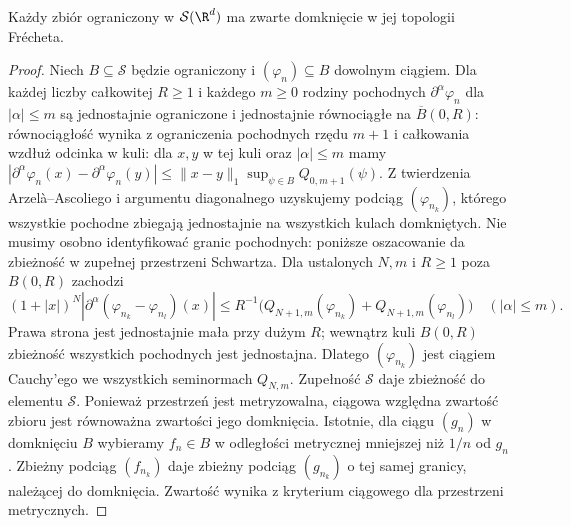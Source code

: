 \begin{lemat}
\label{lem:montel-schwartz22}
Każdy zbiór ograniczony w $\mathcal S(\R^d)$ ma zwarte
domknięcie w jej topologii Frécheta.
\end{lemat}
\begin{proof}
Niech $B\subseteq\mathcal S$ będzie ograniczony i
$(\varphi_n)\subseteq B$ dowolnym ciągiem.
Dla każdej liczby całkowitej $R\ge1$ i każdego $m\ge0$
rodziny pochodnych $\partial^\alpha\varphi_n$ dla
$|\alpha|\le m$ są jednostajnie ograniczone i
jednostajnie równociągłe na $\overline B(0,R)$:
równociągłość wynika z ograniczenia pochodnych
rzędu $m+1$ i całkowania wzdłuż odcinka w kuli:
dla $x,y$ w tej kuli oraz $|\alpha|\le m$ mamy
$|\partial^\alpha\varphi_n(x)-\partial^\alpha\varphi_n(y)|
\le\|x-y\|_1\sup_{\psi\in B}Q_{0,m+1}(\psi)$. Z twierdzenia Arzelà--Ascoliego
i argumentu diagonalnego uzyskujemy podciąg
$(\varphi_{n_k})$, którego wszystkie pochodne zbiegają
jednostajnie na wszystkich kulach domkniętych.
Nie musimy osobno identyfikować granic pochodnych:
poniższe oszacowanie da zbieżność w zupełnej
przestrzeni Schwartza.
Dla ustalonych $N,m$ i $R\ge1$ poza $B(0,R)$ zachodzi
\[
(1+|x|)^N|\partial^\alpha(\varphi_{n_k}-\varphi_{n_l})(x)|
\le R^{-1}\bigl(Q_{N+1,m}(\varphi_{n_k})
+Q_{N+1,m}(\varphi_{n_l})\bigr)\quad(|\alpha|\le m).
\]
Prawa strona jest jednostajnie mała przy dużym $R$;
wewnątrz kuli $B(0,R)$ zbieżność wszystkich pochodnych
jest jednostajna. Dlatego $(\varphi_{n_k})$ jest ciągiem
Cauchy'ego we wszystkich seminormach $Q_{N,m}$.
Zupełność $\mathcal S$ daje zbieżność do elementu
$\mathcal S$. Ponieważ przestrzeń jest metryzowalna,
ciągowa względna zwartość zbioru jest równoważna
zwartości jego domknięcia. Istotnie, dla ciągu $(g_n)$
w domknięciu $B$ wybieramy $f_n\in B$ w odległości
metrycznej mniejszej niż $1/n$ od $g_n$.
Zbieżny podciąg $(f_{n_k})$ daje zbieżny podciąg
$(g_{n_k})$ o tej samej granicy, należącej do domknięcia.
Zwartość wynika z kryterium ciągowego dla przestrzeni
metrycznych.
\end{proof}

